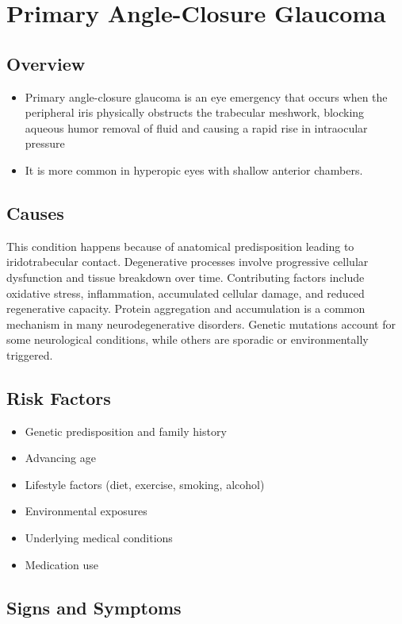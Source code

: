 \chapter{Primary Angle-Closure Glaucoma}
\label{sec:Primary Angle-Closure Glaucoma}

\section{Overview}


\begin{itemize}[noitemsep]
  \item Primary angle-closure glaucoma is an eye emergency that occurs when the peripheral iris physically obstructs the trabecular meshwork, blocking aqueous humor removal of fluid and causing a rapid rise in intraocular pressure
  \item It is more common in hyperopic eyes with shallow anterior chambers.
\end{itemize}
\section{Causes}
This condition happens because of anatomical predisposition leading to iridotrabecular contact.   Degenerative processes involve progressive cellular dysfunction and tissue breakdown over time. Contributing factors include oxidative stress, inflammation, accumulated cellular damage, and reduced regenerative capacity.  Protein aggregation and accumulation is a common mechanism in many neurodegenerative disorders.  Genetic mutations account for some neurological conditions, while others are sporadic or environmentally triggered.   
\section{Risk Factors}
\begin{itemize}[noitemsep]
  \item Genetic predisposition and family history
  \item Advancing age
  \item Lifestyle factors (diet, exercise, smoking, alcohol)
  \item Environmental exposures
  \item Underlying medical conditions
  \item Medication use
\end{itemize}
\section{Signs and Symptoms}
